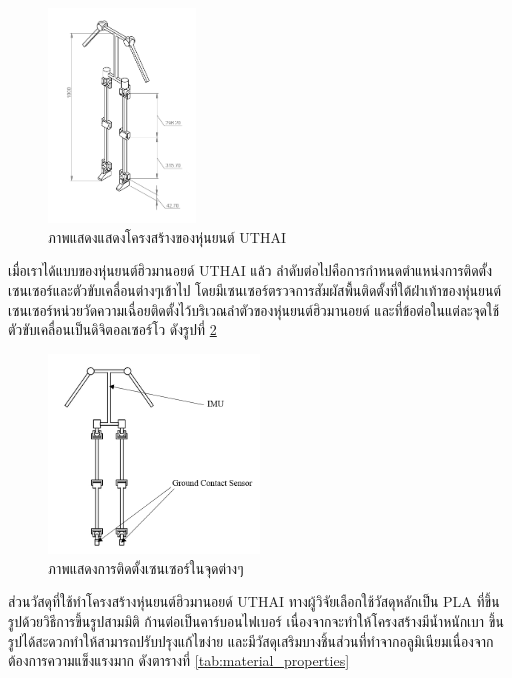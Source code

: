 \begin{figure}[!ht]
    \centering
    \includegraphics[width=0.35\textwidth]{chapter3/images/uthai_structure1.png}
    \caption{ภาพแสดงแสดงโครงสร้างของหุ่นยนต์ UTHAI}
    \label{fig:uthai_structure1}
\end{figure}

เมื่อเราได้แบบของหุ่นยนต์ฮิวมานอยด์ UTHAI แล้ว ลำดับต่อไปคือการกำหนดตำแหน่งการติดตั้งเซนเซอร์และตัวขับเคลื่อนต่างๆเข้าไป
โดยมีเซนเซอร์ตรวจการสัมผัสพื้นติดตั้งที่ใต้ฝ่าเท้าของหุ่นยนต์ เซนเซอร์หน่วยวัดความเฉื่อยติดตั้งไว้บริเวณลำตัวของหุ่นยนต์ฮิวมานอยด์
และที่ข้อต่อในแต่ละจุดใช้ตัวขับเคลื่อนเป็นดิจิตอลเซอร์โว ดังรูปที่ \ref{fig:uthai_structure2}

\begin{figure}[!ht]
    \centering
    \includegraphics[width=0.5\textwidth]{chapter3/images/uthai_sensor.PNG}
    \caption{ภาพแสดงการติดตั้งเซนเซอร์ในจุดต่างๆ}
    \label{fig:uthai_structure2}
\end{figure}

ส่วนวัสดุที่ใช้ทำโครงสร้างหุ่นยนต์ฮิวมานอยด์ UTHAI ทางผู้วิจัยเลือกใช้วัสดุหลักเป็น PLA ที่ขึ้นรูปด้วยวิธีการขึ้นรูปสามมิติ
ก้านต่อเป็นคาร์บอนไฟเบอร์ เนื่องจากจะทำให้โครงสร้างมีน้ำหนักเบา ขึ้นรูปได้สะดวกทำให้สามารถปรับปรุงแก้ไขง่าย
และมีวัสดุเสริมบางชิ้นส่วนที่ทำจากอลูมิเนียมเนื่องจากต้องการความแข็งแรงมาก ดังตารางที่ \ref{tab:material_properties}

